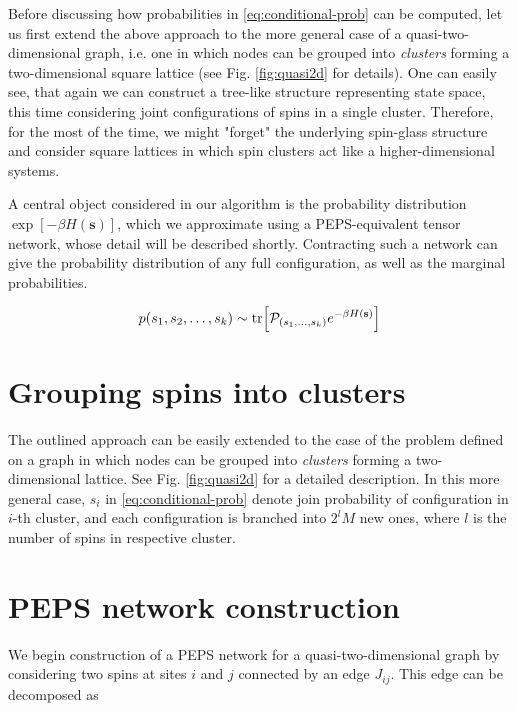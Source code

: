 Before discussing how probabilities in \eqref{eq:conditional-prob} can be
computed, let us first extend the above approach to the more general case of a
quasi-two-dimensional graph, i.e. one in which nodes can be grouped into
\emph{clusters} forming a two-dimensional square lattice (see Fig.
\ref{fig:quasi2d} for details). One can easily see, that again we can construct
a tree-like structure representing state space, this time considering joint
configurations of spins in a single cluster. Therefore, for the most of the
time, we might "forget" the underlying spin-glass structure and consider square
lattices in which spin clusters act like a higher-dimensional systems.

A central object considered in our algorithm is the probability distribution
$\exp[-\beta H(\mathbf{s})]$, which we approximate using a PEPS-equivalent
tensor network, whose detail will be described shortly. Contracting such a
network can give the probability distribution of any full configuration, as
well as the marginal probabilities.

\begin{equation}
  p(s_1, s_2, \ldots, s_k) \sim \tr[\mathcal{P}_{(s_1, \ldots, s_k)} e^{-\beta H(\mathbf{s})}]
\end{equation}

\section{Grouping spins into clusters}
The outlined approach can be easily extended to the case of the problem defined
on a graph in which nodes can be grouped into \emph{clusters} forming a
two-dimensional lattice. See Fig. \ref{fig:quasi2d} for a detailed description.
In this more general case, $s_i$ in \eqref{eq:conditional-prob} denote join
probability of configuration in $i$-th cluster, and each configuration is
branched into $2^lM$ new ones, where $l$ is the number of spins in respective
cluster.

\section{PEPS network construction}
We begin construction of a PEPS network for a quasi-two-dimensional graph by
considering two spins at sites $i$ and $j$ connected by an edge $J_{ij}$. This
edge can be decomposed as

